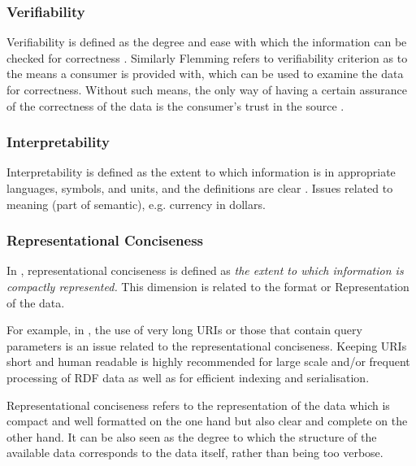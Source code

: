 \subsubsection{Verifiability}
Verifiability is defined as the degree and ease with which the information can be checked for correctness  \cite{Bizerthesis}. Similarly Flemming refers to verifiability criterion as to the means a consumer is provided with, which can be used to examine the data for correctness. Without such means, the only way of having a certain assurance of the correctness of the data is the consumer's trust in the source  \cite{Flemming}. 

\subsubsection{Interpretability}
Interpretability is defined as the extent to which information is in appropriate languages, symbols, and units, and the definitions are clear \cite{Bizerthesis}. Issues related to meaning (part of semantic), e.g. currency in dollars.  %

\subsubsection{Representational Conciseness}
In \cite{Bizerthesis}, representational conciseness is defined as \emph{the extent to which information is compactly represented.} 
This dimension is related to the format or Representation of the data.

For example, in \cite{Hogan:2012}, the use of very long URIs or those that contain query parameters is an issue related to the representational conciseness. 
Keeping URIs short and human readable is highly recommended for large scale and/or frequent processing of RDF data as well as for efficient indexing and serialisation. 

\begin{definition}
Representational conciseness refers to the representation of the data which is compact and well formatted on the one hand but also clear and complete on the other hand. 
It can be also seen as the degree to which the structure of the available data corresponds to the data itself, rather than being too verbose. 
\end{definition}

